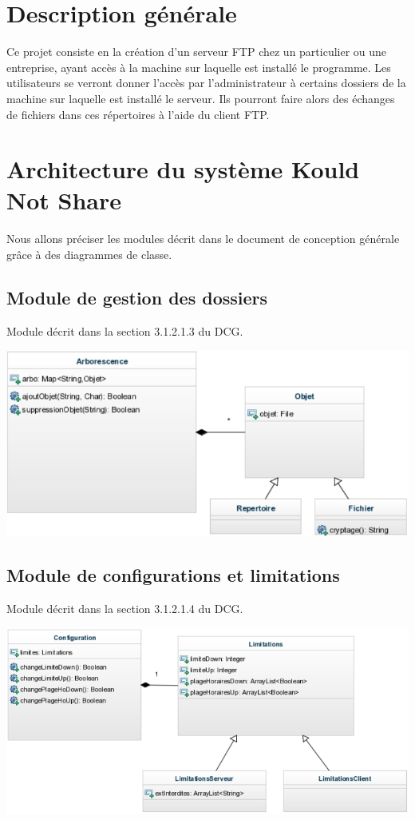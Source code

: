 \documentclass[10pt,a4paper]{report}
\begin{document}
\section{Description générale}

Ce projet consiste en la création d'un serveur FTP chez un particulier ou une entreprise, ayant accès à la machine sur laquelle est installé le programme. Les utilisateurs se verront donner l'accès par l'administrateur à certains dossiers de la machine sur laquelle est installé le serveur. Ils pourront faire alors des échanges de fichiers dans ces répertoires à l'aide du client FTP.\\

\section{Architecture du système Kould Not Share}
Nous allons préciser les modules décrit dans le document de conception générale grâce à des diagrammes de classe.
\subsection{Module de gestion des dossiers}
Module décrit dans la section 3.1.2.1.3 du DCG.
\begin{center}
	\includegraphics[scale=0.5]{./Ressources/modules_doss.png}\\
\end{center}

\subsection{Module de configurations et limitations}
Module décrit dans la section 3.1.2.1.4 du DCG.
\begin{center}
	\includegraphics[scale=0.5]{./Ressources/modules_lim.png}\\
\end{center}
\end{document}
